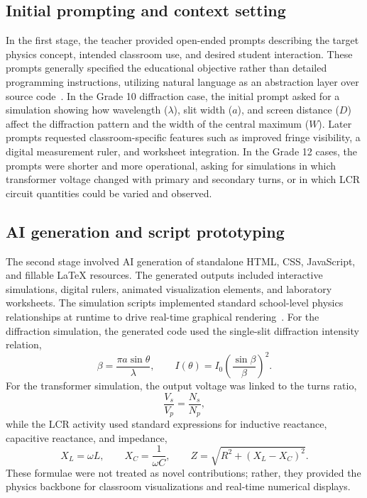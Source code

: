 \documentclass{iopjournal}
\begin{document}
\subsection{Initial prompting and context setting}

In the first stage, the teacher provided open-ended prompts describing the target physics concept, intended classroom use, and desired student interaction. These prompts generally specified the educational objective rather than detailed programming instructions, utilizing natural language as an abstraction layer over source code~\cite{xing2025}. In the Grade 10 diffraction case, the initial prompt asked for a simulation showing how wavelength ($\lambda$), slit width ($a$), and screen distance ($D$) affect the diffraction pattern and the width of the central maximum ($W$). Later prompts requested classroom-specific features such as improved fringe visibility, a digital measurement ruler, and worksheet integration. In the Grade 12 cases, the prompts were shorter and more operational, asking for simulations in which transformer voltage changed with primary and secondary turns, or in which LCR circuit quantities could be varied and observed.

\subsection{AI generation and script prototyping}

The second stage involved AI generation of standalone HTML, CSS, JavaScript, and fillable \LaTeX{} resources. The generated outputs included interactive simulations, digital rulers, animated visualization elements, and laboratory worksheets. The simulation scripts implemented standard school-level physics relationships at runtime to drive real-time graphical rendering~\cite{rutten2012}. For the diffraction simulation, the generated code used the single-slit diffraction intensity relation,
\begin{equation}
\beta = \frac{\pi a \sin\theta}{\lambda}, \qquad I(\theta) = I_0 \left(\frac{\sin\beta}{\beta}\right)^2 .
\end{equation}
For the transformer simulation, the output voltage was linked to the turns ratio,
\begin{equation}
\frac{V_s}{V_p}=\frac{N_s}{N_p},
\end{equation}
while the LCR activity used standard expressions for inductive reactance, capacitive reactance, and impedance,
\begin{equation}
X_L=\omega L, \qquad X_C=\frac{1}{\omega C}, \qquad Z=\sqrt{R^2+(X_L-X_C)^2}.
\end{equation}
These formulae were not treated as novel contributions; rather, they provided the physics backbone for classroom visualizations and real-time numerical displays.
\end{document}
